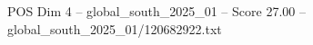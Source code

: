 \begin{textsample}{POS Dim 4 – global\_south\_2025\_01 – Score 27.00 – global\_south\_2025\_01/120682922.txt}
\end{textsample}
